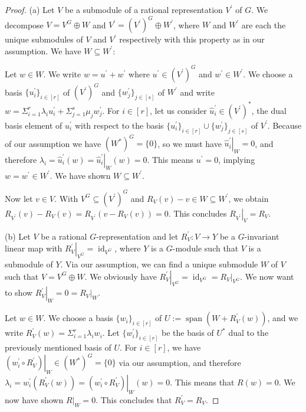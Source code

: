 \begin{proof}
  (a) \; Let $V$ be a submodule of a rational representation $V^\prime$ of $G$.
  We decompose $V = V^G \oplus W$ and $V^\prime = (V^\prime)^G \oplus W^\prime$, where $W$ and $W^\prime$ are each the unique submodules of $V$ and $V^\prime$ respectively with this property as in our assumption.
  We have $W \subseteq W^\prime$:
  
  Let $w \in W$.
  We write $w = u^\prime + w^\prime$ where $u^\prime \in (V^\prime)^G$ and $w^\prime \in W^\prime$.
  We choose a basis $\{u^\prime_i\}_{i \in [r]}$ of $(V^\prime)^G$ and $\{w^\prime_j\}_{j \in [s]}$ of $W^\prime$ and write \linebreak$w = \Sigma_{i=1}^r \lambda_i u^\prime_i + \Sigma_{j=1}^s \mu_j w^\prime_j$.
  For $i \in [r]$, let us consider $\hat{u}^\prime_i \in (V^\prime)^\ast$, the dual basis element of $u^\prime_i$ with respect to the basis $\{u^\prime_i\}_{i \in [r]} \cup \{w^\prime_j\}_{j \in [s]}$ of $V^\prime$.
  Because of our assumption we have $(W^\ast)^G = \{0\}$, so we must have $\left. \hat{u}^\prime_i \right|_W = 0$, and therefore $\lambda_i = \hat{u}^\prime_i (w) = \left. \hat{u}^\prime_i \right|_W (w) = 0$.
  This means $u^\prime = 0$, implying $ w  = w^\prime \in W^\prime $.
  We have shown $W \subseteq W^\prime$.
  
  Now let $v \in V$.
  With $V^G \subseteq (V^\prime)^G$ and $R_V (v) - v \in W \subseteq W^\prime$, we obtain $R_{V^\prime}(v) - R_V (v) = R_{V^\prime}(v - R_V(v)) = 0$.
  This concludes $\left. R_{V^\prime} \right|_V = R_V$.
  
  (b) \; Let $V$ be a rational $G$-representation and let $R^\prime_V \colon V \rightarrow Y$ be a \linebreak$G$-invariant linear map with $ \left. R^\prime_V \right|_{V^G} = \operatorname{id}_{V^G}$, where $Y$ is a $G$-module such that $V$ is a submodule of $Y$.
  Via our assumption, we can find a unique submodule $W$ of $V$ such that $V = V^G \oplus W$.
  We obviously have $\left. R^\prime_V \right|_{V^G} = \operatorname{id}_{V^G} = \left. R_V \right|_{V^G}$.
  We now want to show $\left. R^\prime_V \right|_W = 0 = \left. R_V \right|_W$.
  
  Let $w \in W$.
  We choose a basis $\{w_i\}_{i \in [r]}$ of $U:= \operatorname{span}(W + R^\prime_V (w))$, and we write $R^\prime_V (w) = \Sigma_{i=1}^r \lambda_i w_i$.
  Let $\{w^\prime_i\}_{i \in [r]}$ be the basis of $U^\ast$ dual to the previously mentioned basis of $U$.
  For $i \in [r]$, we have $\left. (w^\prime_i \circ R^\prime_V) \right|_W \in (W^\ast)^G = \{0\}$ via our assumption, and therefore $ \lambda_i = w^\prime_i (R^\prime_V(w)) = \left. (w^\prime_i \circ R^\prime_V) \right|_W (w) = 0$.
  This means that $R(w) = 0$.
  We now have shown $\left. R \right|_{W} = 0$.
  This concludes that $R^\prime_V = R_V$.
  

\end{proof}
